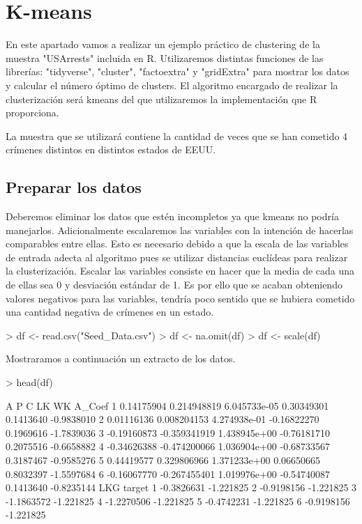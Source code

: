 \documentclass [a4paper] {article}
\begin{document}
\newpage
\section{K-means}
En este apartado vamos a realizar un ejemplo práctico de clustering de la muestra "USArrests" incluida en R.
Utilizaremos distintas funciones de las librerías: "tidyverse", "cluster", "factoextra" y "gridExtra" para mostrar los datos y calcular el número óptimo de clusters.
El algoritmo encargado de realizar la clusterización será kmeans del que utilizaremos la implementación que R proporciona.

La muestra que se utilizará contiene la cantidad de veces que se han cometido 4 crímenes distintos en distintos estados de EEUU.

\subsection{Preparar los datos}
Deberemos eliminar los datos que estén incompletos ya que kmeans no podría manejarlos.
Adicionalmente escalaremos las variables con la intención de hacerlas comparables entre ellas.
Esto es necesario debido a que la escala de las variables de entrada adecta al algoritmo pues se utilizar distancias euclídeas para realizar la clusterización.
Escalar las variables consiste en hacer que la media de cada una de ellas sea 0 y desviación estándar de 1.
Es por ello que se acaban obteniendo valores negativos para las variables, tendría poco sentido que se hubiera cometido una cantidad negativa de crímenes en un estado.
\begin{Schunk}
\begin{Sinput}
> df <- read.csv("Seed_Data.csv")
> df <- na.omit(df)
> df <- scale(df)
\end{Sinput}
\end{Schunk}
Mostraramos a continuación un extracto de los datos.
\begin{Schunk}
\begin{Sinput}
> head(df)
\end{Sinput}
\begin{Soutput}
            A            P            C          LK        WK     A_Coef
1  0.14175904  0.214948819 6.045733e-05  0.30349301 0.1413640 -0.9838010
2  0.01116136  0.008204153 4.274938e-01 -0.16822270 0.1969616 -1.7839036
3 -0.19160873 -0.359341919 1.438945e+00 -0.76181710 0.2075516 -0.6658882
4 -0.34626388 -0.474200066 1.036904e+00 -0.68733567 0.3187467 -0.9585276
5  0.44419577  0.329806966 1.371233e+00  0.06650665 0.8032397 -1.5597684
6 -0.16067770 -0.267455401 1.019976e+00 -0.54740087 0.1413640 -0.8235144
         LKG    target
1 -0.3826631 -1.221825
2 -0.9198156 -1.221825
3 -1.1863572 -1.221825
4 -1.2270506 -1.221825
5 -0.4742231 -1.221825
6 -0.9198156 -1.221825
\end{Soutput}
\end{Schunk}
\end{document}
